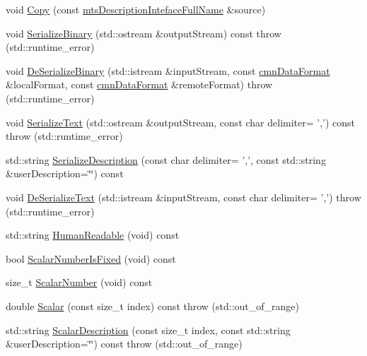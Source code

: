 \begin{DoxyCompactItemize}
\item 
void \hyperlink{classmts_description_inteface_full_name_acfb4f72aa2669df862ef62e48952bb31}{Copy} (const \hyperlink{classmts_description_inteface_full_name}{mts\-Description\-Inteface\-Full\-Name} \&source)
\item 
void \hyperlink{classmts_description_inteface_full_name_a569b18643eef587c690ddcb453fc53bd}{Serialize\-Binary} (std\-::ostream \&output\-Stream) const   throw (std\-::runtime\-\_\-error)
\item 
void \hyperlink{classmts_description_inteface_full_name_a3281a4a51929da129237e2d3378c9e2a}{De\-Serialize\-Binary} (std\-::istream \&input\-Stream, const \hyperlink{classcmn_data_format}{cmn\-Data\-Format} \&local\-Format, const \hyperlink{classcmn_data_format}{cmn\-Data\-Format} \&remote\-Format)  throw (std\-::runtime\-\_\-error)
\item 
void \hyperlink{classmts_description_inteface_full_name_afa4ff9facf2402c9f272723c094c71d5}{Serialize\-Text} (std\-::ostream \&output\-Stream, const char delimiter= ',') const   throw (std\-::runtime\-\_\-error)
\item 
std\-::string \hyperlink{classmts_description_inteface_full_name_aeccacf1652d6b76c91855c5a55d8324e}{Serialize\-Description} (const char delimiter= ',', const std\-::string \&user\-Description=\char`\"{}\char`\"{}) const 
\item 
void \hyperlink{classmts_description_inteface_full_name_ac8f0f22b44c061ac00b3c37345b1264c}{De\-Serialize\-Text} (std\-::istream \&input\-Stream, const char delimiter= ',')  throw (std\-::runtime\-\_\-error)
\item 
std\-::string \hyperlink{classmts_description_inteface_full_name_a3af4d088b7dc68d64708384ec68a68af}{Human\-Readable} (void) const 
\item 
bool \hyperlink{classmts_description_inteface_full_name_a8b54a18f39b8b61c8b94e1256cc4de01}{Scalar\-Number\-Is\-Fixed} (void) const 
\item 
size\-\_\-t \hyperlink{classmts_description_inteface_full_name_aedad99d3a68de542986916e3d4f26cdd}{Scalar\-Number} (void) const 
\item 
double \hyperlink{classmts_description_inteface_full_name_a9d72e1b4ee6f1c1ae572a288b876fa46}{Scalar} (const size\-\_\-t index) const   throw (std\-::out\-\_\-of\-\_\-range)
\item 
std\-::string \hyperlink{classmts_description_inteface_full_name_a57819a1fb8f9c5c84fcaab8fbe5d5acf}{Scalar\-Description} (const size\-\_\-t index, const std\-::string \&user\-Description=\char`\"{}\char`\"{}) const   throw (std\-::out\-\_\-of\-\_\-range)
\end{DoxyCompactItemize}
